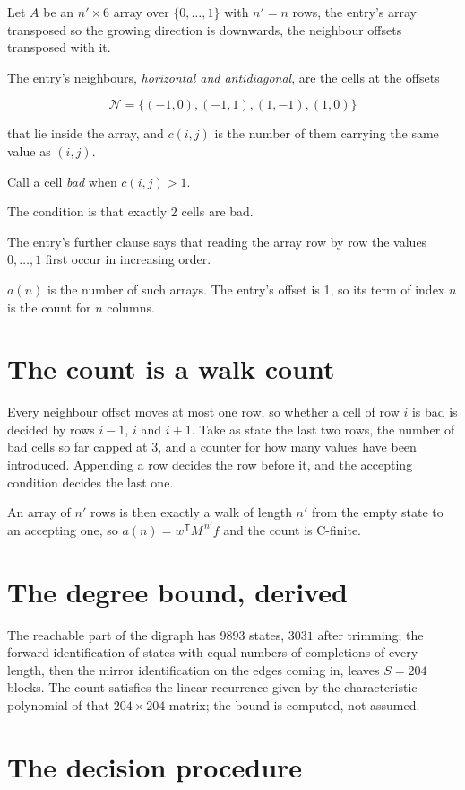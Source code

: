 \documentclass[11pt]{article}
\theoremstyle{definition}
\begin{document}
Let $A$ be an $n' \times 6$ array over $\{0,\dots,1\}$ with $n' = n$ rows, the entry's array transposed so the growing direction is downwards, the neighbour offsets transposed with it.

The entry's neighbours, {\itshape horizontal and antidiagonal}, are the cells at the offsets

\[\mathcal{N} = \{(-1,0), (-1,1), (1,-1), (1,0)\}\]

that lie inside the array, and $c(i,j)$ is the number of them carrying the same value as $(i,j)$.

Call a cell {\itshape bad} when $c(i,j) > 1$.

The condition is that exactly 2 cells are bad.

The entry's further clause says that reading the array row by row the values $0,\dots,1$ first occur in increasing order.

$a(n)$ is the number of such arrays. The entry's offset is 1, so its term of index $n$ is the count for $n$ columns.

\section{The count is a walk count}

Every neighbour offset moves at most one row, so whether a cell of row $i$ is bad is decided by rows $i-1$, $i$ and $i+1$. Take as state the last two rows, the number of bad cells so far capped at 3, and a counter for how many values have been introduced. Appending a row decides the row before it, and the accepting condition decides the last one.

An array of $n'$ rows is then exactly a walk of length $n'$ from the empty state to an accepting one, so $a(n) = w^{\mathsf T}M^{\,n'}f$ and the count is C-finite.

\section{The degree bound, derived}

The reachable part of the digraph has $9893$ states, $3031$ after trimming; the forward identification of states with equal numbers of completions of every length, then the mirror identification on the edges coming in, leaves $S = 204$ blocks. The count satisfies the linear recurrence given by the characteristic polynomial of that $204\times204$ matrix; the bound is computed, not assumed.

\section{The decision procedure}
\end{document}
